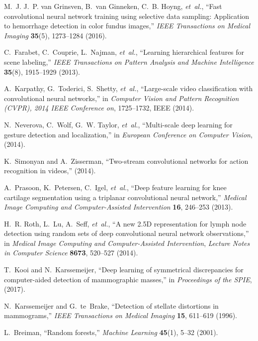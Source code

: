 \documentclass[12pt]{spieman}  %
\begin{document}
\begin{thebibliography}{10}
M.~J. J.~P. van Grinsven, B.~van Ginneken, C.~B. Hoyng, {\em et~al.}, ``Fast
  convolutional neural network training using selective data sampling:
  Application to hemorrhage detection in color fundus images,'' {\em IEEE
  Transactions on Medical Imaging} {\bf 35}(5), 1273--1284  (2016).

C.~Farabet, C.~Couprie, L.~Najman, {\em et~al.}, ``Learning hierarchical
  features for scene labeling,'' {\em IEEE Transactions on Pattern Analysis and
  Machine Intelligence} {\bf 35}(8), 1915--1929  (2013).

A.~Karpathy, G.~Toderici, S.~Shetty, {\em et~al.}, ``Large-scale video
  classification with convolutional neural networks,'' in {\em Computer Vision
  and Pattern Recognition (CVPR), 2014 IEEE Conference on},  1725--1732, IEEE
  (2014).

N.~Neverova, C.~Wolf, G.~W. Taylor, {\em et~al.}, ``Multi-scale deep learning
  for gesture detection and localization,'' in {\em European Conference on
  Computer Vision},   (2014).

K.~Simonyan and A.~Zisserman, ``Two-stream convolutional networks for action
  recognition in videos,''  (2014).

A.~Prasoon, K.~Petersen, C.~Igel, {\em et~al.}, ``Deep feature learning for
  knee cartilage segmentation using a triplanar convolutional neural network,''
  {\em Medical Image Computing and Computer-Assisted Intervention} {\bf 16},
  246--253  (2013).

H.~R. Roth, L.~Lu, A.~Seff, {\em et~al.}, ``A new {2.5D} representation for
  lymph node detection using random sets of deep convolutional neural network
  observations,'' in {\em Medical Image Computing and Computer-Assisted
  Intervention},  {\em Lecture Notes in Computer Science} {\bf 8673}, 520--527
  (2014).

T.~Kooi and N.~Karssemeijer, ``Deep learning of symmetrical discrepancies for
  computer-aided detection of mammographic masses,'' in {\em Proceedings of the
  SPIE},   (2017).

N.~Karssemeijer and G.~te~Brake, ``Detection of stellate distortions in
  mammograms,'' {\em IEEE Transactions on Medical Imaging} {\bf 15}, 611--619
  (1996).

L.~Breiman, ``Random forests,'' {\em Machine Learning} {\bf 45}(1), 5--32
  (2001).


\end{thebibliography}
\end{document}
